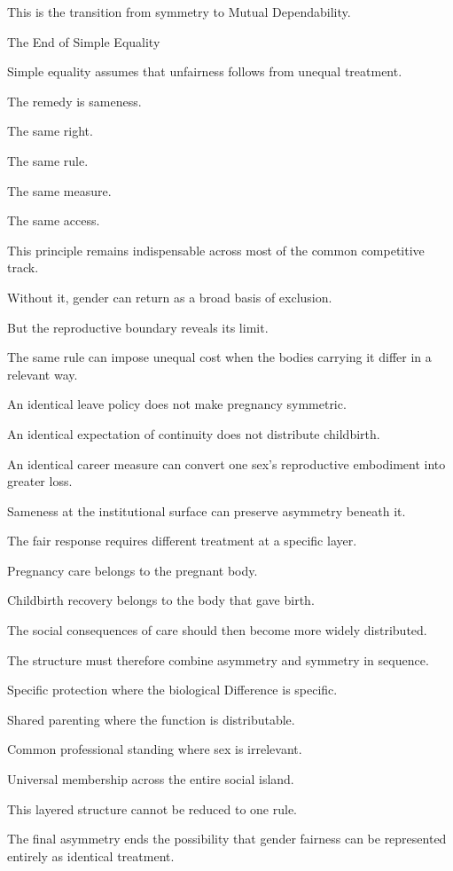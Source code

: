 This is the transition from symmetry to Mutual Dependability.

The End of Simple Equality

Simple equality assumes that unfairness follows from unequal treatment.

The remedy is sameness.

The same right.

The same rule.

The same measure.

The same access.

This principle remains indispensable across most of the common competitive track.

Without it, gender can return as a broad basis of exclusion.

But the reproductive boundary reveals its limit.

The same rule can impose unequal cost when the bodies carrying it differ in a relevant way.

An identical leave policy does not make pregnancy symmetric.

An identical expectation of continuity does not distribute childbirth.

An identical career measure can convert one sex’s reproductive embodiment into greater loss.

Sameness at the institutional surface can preserve asymmetry beneath it.

The fair response requires different treatment at a specific layer.

Pregnancy care belongs to the pregnant body.

Childbirth recovery belongs to the body that gave birth.

The social consequences of care should then become more widely distributed.

The structure must therefore combine asymmetry and symmetry in sequence.

Specific protection where the biological Difference is specific.

Shared parenting where the function is distributable.

Common professional standing where sex is irrelevant.

Universal membership across the entire social island.

This layered structure cannot be reduced to one rule.

The final asymmetry ends the possibility that gender fairness can be represented entirely as identical treatment.

